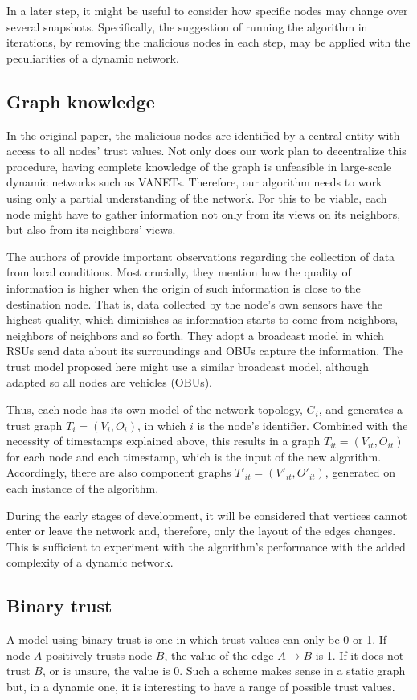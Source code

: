 In a later step, it might be useful to consider how specific nodes may change over several snapshots.
Specifically, the suggestion of running the algorithm in iterations, by removing the malicious nodes in each step, may be applied with the peculiarities of a dynamic network.

\subsection{Graph knowledge}
In the original paper, the malicious nodes are identified by a central entity with access to all nodes' trust values.
Not only does our work plan to decentralize this procedure, having complete knowledge of the graph is unfeasible in large-scale dynamic networks such as VANETs.
Therefore, our algorithm needs to work using only a partial understanding of the network.
For this to be viable, each node might have to gather information not only from its views on its neighbors, but also from its neighbors' views.

The authors of \cite{patwardhan2006data} provide important observations regarding the collection of data from local conditions.
Most crucially, they mention how the quality of information is higher when the origin of such information is close to the destination node.
That is, data collected by the node's own sensors have the highest quality, which diminishes as information starts to come from neighbors, neighbors of neighbors and so forth.
They adopt a broadcast model in which RSUs send data about its surroundings and OBUs capture the information.
The trust model proposed here might use a similar broadcast model, although adapted so all nodes are vehicles (OBUs).

Thus, each node has its own model of the network topology, $G_i$, and generates a trust graph $T_i=(V_i, O_i)$, in which $i$ is the node's identifier.
Combined with the necessity of timestamps explained above, this results in a graph $T_{it}=(V_{it}, O_{it})$ for each node and each timestamp, which is the input of the new algorithm.
Accordingly, there are also component graphs $T'_{it}=(V'_{it}, O'_{it})$, generated on each instance of the algorithm.

During the early stages of development, it will be considered that vertices cannot enter or leave the network and, therefore, only the layout of the edges changes.
This is sufficient to experiment with the algorithm's performance with the added complexity of a dynamic network.


\subsection{Binary trust}
A model using binary trust is one in which trust values can only be 0 or 1.
If node $A$ positively trusts node $B$, the value of the edge $A\rightarrow B$ is 1.
If it does not trust $B$, or is unsure, the value is 0.
Such a scheme makes sense in a static graph but, in a dynamic one, it is interesting to have a range of possible trust values.

